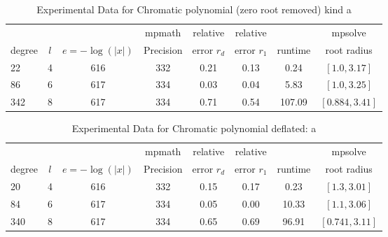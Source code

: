 \documentclass[sigconf]{acmart}
\begin{document}
\begin{table}[t]
\caption{Experimental Data for Chromatic polynomial (zero root removed) kind a}
\label{tab:chrma}
\vskip 0.15in
\begin{center}
\begin{small}
\begin{sc}
\begin{tabular}{lccccccc}
\toprule
&  &  & mpmath & relative  & relative &  & mpsolve \\
degree  & $l$& $e=-\log(|x|)$& Precision &error $r_d$       & error $r_1$ &runtime& root radius\\
\midrule
 22   & 4 & 616 & 332 & 0.21 & 0.13 & 0.24 & $[1.0, 3.17]$ \\
 86   & 6 & 617 & 334 & 0.03 & 0.04 & 5.83 & $[1.0, 3.25 ]$ \\
 342 & 8 & 617 & 334 & 0.71 & 0.54 & 107.09 & $[0.884, 3.41]$\\
\bottomrule
\end{tabular}
\end{sc}
\end{small}
\end{center}
\vskip -0.1in
\end{table}


\begin{table}[t]
\caption{Experimental Data for Chromatic polynomial deflated: a}
\label{tab:chrma_d}
\vskip 0.15in
\begin{center}
\begin{small}
\begin{sc}
\begin{tabular}{lccccccc}
\toprule
&  &  & mpmath & relative  & relative &  & mpsolve \\
degree  & $l$& $e=-\log(|x|)$& Precision &error $r_d$       & error $r_1$ &runtime& root radius\\
\midrule
   20 & 4 & 616 & 332 & 0.15 & 0.17 &   0.23 & $[1.3, 3.01]$ \\
   84 & 6 & 617 & 334 & 0.05 & 0.00 & 10.33 & $[1.1, 3.06]$\\
 340 & 8 & 617 & 334 & 0.65 & 0.69 & 96.91 & $[0.741, 3.11]$\\
\bottomrule
\end{tabular}
\end{sc}
\end{small}
\end{center}
\vskip -0.1in
\end{table}
\end{document}
